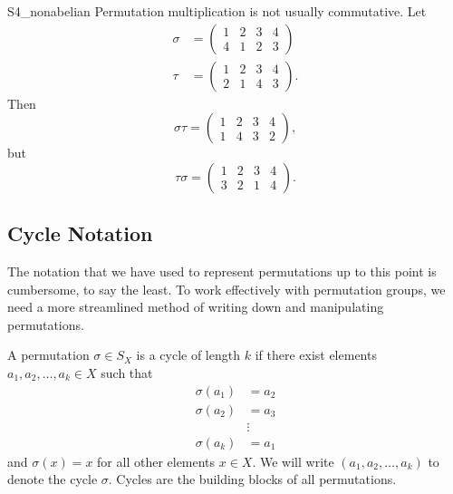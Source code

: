\begin{example}{S4_nonabelian}
Permutation multiplication is not usually commutative. Let
\begin{align*}
\sigma
& =
\begin{pmatrix}
1 & 2 & 3 & 4  \\
4 & 1 & 2 & 3
\end{pmatrix} \\
\tau
& =
\begin{pmatrix}
1 & 2 & 3 & 4 \\
2 & 1 & 4 & 3
\end{pmatrix}.
\end{align*}
Then
\[
\sigma \tau
=
\begin{pmatrix}
1 & 2 & 3 & 4 \\
1 & 4 & 3 & 2
\end{pmatrix},
\]
but
\[
\tau \sigma
=
\begin{pmatrix}
1 & 2 & 3 & 4 \\
3 & 2 & 1 & 4
\end{pmatrix}.
\]
\end{example}
 
 
\subsection*{Cycle Notation}
 
The notation that we have used to represent permutations up to this
point is cumbersome, to say the least.  To work effectively with
permutation groups, we need a more streamlined method of writing
down and manipulating permutations.
 
 
A permutation $\sigma \in S_X$ is a {\bfi cycle of
length}
$k$ if there exist elements $a_1, a_2, \ldots, a_k \in X$ such that 
\begin{align*}
\sigma( a_1 ) & = a_2 \\
\sigma( a_2 ) & = a_3 \\
              & \vdots   \\
\sigma( a_k ) & = a_1
\end{align*}
and $\sigma( x) =x$ for all other elements $x \in X$. We will write
$(a_1, a_2, \ldots, a_k )$\label{notecycle} to denote the cycle 
$\sigma$. Cycles are the building blocks of all permutations.
 
